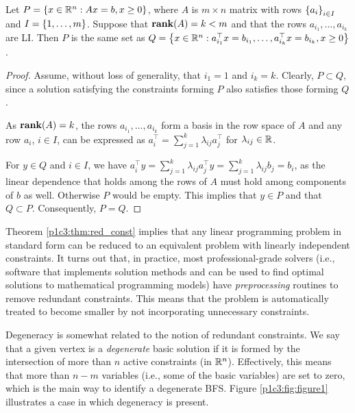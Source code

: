 \begin{theorem}\label{p1c3:thm:red_const}
	Let $P = \left\{ x \in \mathbb{R}^n : Ax = b, x \geq 0 \right \}$, where $A$ is $m \times n$ matrix with rows $\left\{ a_i \right \}_{i \in I}$ and $I = \left\{ 1,\dots,m \right \}$. Suppose that $\mathop{\bf rank}(A) = k < m$ and that the rows $a_{i_1}, \dots, a_{i_k}$ are LI. Then $P$ is the same set as $Q = \left\{  x \in \mathbb{R}^n : a^\top_{i_1}x = b_{i_1}, \dots, a^\top_{i_k}x = b_{i_k}, x \geq 0 \right \}$.
\end{theorem}

\begin{proof}
	Assume, without loss of generality, that $i_1 = 1$ and $i_k = k$. Clearly, $P \subset Q$, since a solution satisfying the constraints forming $P$ also satisfies those forming $Q$.
	
	As $\mathop{\bf rank}(A) = k$, the rows $a_{i_1}, \dots, a_{i_k}$ form a basis in the row space of $A$ and any row $a_i$, $i \in I$, can be expressed as $a^\top_i = \sum_{j=1}^k \lambda_{ij}a_j^\top$ for $\lambda_{ij} \in \mathbb{R}$.
	
	For $y \in Q$ and $i \in I$, we have $a_i^\top y = \sum_{j=1}^k \lambda_{ij}a_j^\top y = \sum_{j=1}^k \lambda_{ij}b_{j} = b_i$, as the linear dependence that holds among the rows of $A$ must hold among components of $b$ as well. Otherwise $P$ would be empty. This implies that $y \in P$ and that $Q \subset P$. Consequently, $P = Q$. \qedhere			
\end{proof}

Theorem \ref{p1c3:thm:red_const} implies that any linear programming problem in standard form can be reduced to an equivalent problem with linearly independent constraints. It turns out that, in practice, most professional-grade solvers (i.e., software that implements solution methods and can be used to find optimal solutions to mathematical programming models) have \emph{preprocessing} routines to remove redundant constraints. This means that the problem is automatically treated to become smaller by not incorporating unnecessary constraints. 

Degeneracy is somewhat related to the notion of redundant constraints. We say that a given vertex is a \emph{degenerate} basic solution if it is formed by the intersection of more than $n$ active constraints (in $\mathbb{R}^n$). Effectively, this means that more than $n-m$ variables (i.e., some of the basic variables) are set to zero, which is the main way to identify a degenerate BFS. Figure \ref{p1c3:fig:figure1} illustrates a case in which degeneracy is present.

